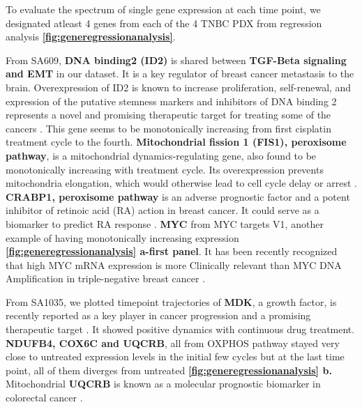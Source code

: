 To evaluate the spectrum of single gene expression at each time point, we designated atleast 4 genes from each of the 4 TNBC PDX from regression analysis \textbf{\autoref{fig:generegressionanalysis}}. 

 From SA609, \textbf{ DNA binding2 (ID2)} is shared between \textbf{TGF-Beta signaling and EMT} in our dataset. It is a key regulator of breast cancer metastasis to the brain. Overexpression of ID2 is known to increase proliferation, self-renewal, and expression of the putative stemness markers and inhibitors of DNA binding 2 represents a novel and promising therapeutic target for treating some of the cancers \cite{bae2017inhibitor, kijewska2019using}. This gene seems to be monotonically increasing from first cisplatin treatment cycle to the fourth. \textbf{Mitochondrial fission 1 (FIS1), peroxisome pathway}, is a mitochondrial dynamics-regulating gene, also found to be monotonically increasing with treatment cycle. Its overexpression prevents mitochondria elongation, which would otherwise lead to cell cycle delay or arrest \cite{fan2015mir, anderson2018dysregulation}. \textbf{CRABP1, peroxisome pathway} is an adverse prognostic factor and a potent inhibitor of retinoic acid (RA) action in breast cancer. It could serve as a biomarker to predict RA response \cite{liu2015crabp1}. \textbf{MYC} from MYC targets V1, another example of having monotonically increasing expression \textbf{\autoref{fig:generegressionanalysis} a-first panel}. It has been recently recognized that high MYC mRNA expression is more Clinically relevant than MYC DNA Amplification in triple-negative breast cancer \cite{chen2008myc, katsuta2020high}.

From SA1035, we plotted timepoint trajectories of \textbf{MDK}, a growth factor, is recently reported as a key player in cancer progression and a promising therapeutic target \cite{filippou2020midkine}. It showed positive dynamics with continuous drug treatment. 
\textbf{NDUFB4, COX6C and UQCRB}, all from \ac{OXPHOS} pathway stayed very close to untreated expression levels in the initial few cycles but at the last time point, all of them diverges from untreated \textbf{\autoref{fig:generegressionanalysis} b.} Mitochondrial \textbf{UQCRB} is known as a molecular prognostic biomarker in colorectal cancer \cite{kim2017mitochondrial}.

